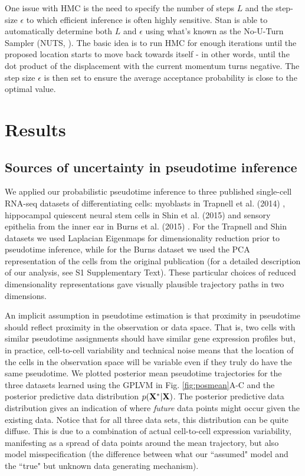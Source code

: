 One issue with HMC is the need to specify the number of steps $L$ and the step-size $\epsilon$ to which efficient inference is often highly sensitive. Stan is able to automatically determine both $L$ and $\epsilon$ using what's known as the No-U-Turn Sampler (NUTS, \cite{Hoffman2014-pl}). The basic idea is to run HMC for enough iterations until the proposed location starts to move back towards itself - in other words, until the dot product of the displacement with the current momentum turns negative. The step size $\epsilon$ is then set to ensure the average acceptance probability is close to the optimal value.




\section{Results}



\subsection{Sources of uncertainty in pseudotime inference}

We applied our probabilistic pseudotime inference to three published single-cell RNA-seq datasets of differentiating cells: myoblasts in Trapnell et al. (2014) \cite{Trapnell2014}, hippocampal quiescent neural stem cells in Shin et al. (2015) \cite{Shin2015} and sensory epithelia from the inner ear in Burns et al. (2015) \cite{Burns2015}. For the Trapnell and Shin datasets we used Laplacian Eigenmaps \cite{Belkin2003} for dimensionality reduction prior to pseudotime inference, while for the Burns dataset we used the PCA representation of the cells from the original publication (for a detailed description of our analysis, see S1 Supplementary Text). These particular choices of reduced dimensionality representations gave visually plausible trajectory paths in two dimensions.

An implicit assumption in pseudotime estimation is that proximity in pseudotime should reflect proximity in the observation or data space. That is, two cells with similar pseudotime assignments should have similar gene expression profiles but, in practice, cell-to-cell variability and technical noise means that the location of the cells in the observation space will be variable even if they truly do have the same pseudotime. We plotted posterior mean pseudotime trajectories for the three datasets learned using the GPLVM in Fig. \ref{fig:posmean}A-C and the posterior predictive data distribution $p({\bf X}^*|{\bf X})$. The posterior predictive data distribution gives an indication of where \emph{future} data points might occur given the existing data. Notice that for all three data sets, this distribution can be quite diffuse. This is due to a combination of actual cell-to-cell expression variability, manifesting as a spread of data points around the mean trajectory, but also model misspecification (the difference between what our ``assumed" model and the ``true" but unknown data generating mechanism).


